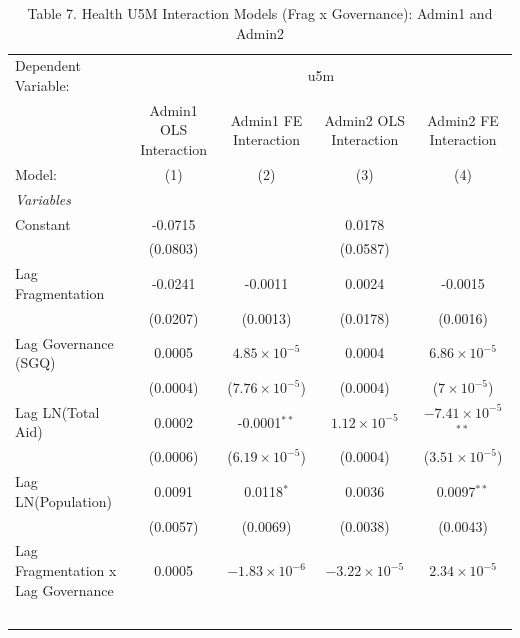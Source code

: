 \begin{table}[H]
   \caption{Table 7. Health U5M Interaction Models (Frag x Governance): Admin1 and Admin2}
   \centering
   \begin{tabular}{lcccc}
      \tabularnewline \midrule \midrule
      Dependent Variable: & \multicolumn{4}{c}{u5m}\\
                                         & Admin1 OLS Interaction & Admin1 FE Interaction   & Admin2 OLS Interaction & Admin2 FE Interaction \\   
      Model:                             & (1)                    & (2)                     & (3)                    & (4)\\  
      \midrule
      \emph{Variables}\\
      Constant                           & -0.0715                &                         & 0.0178                 &   \\   
                                         & (0.0803)               &                         & (0.0587)               &   \\   
      Lag Fragmentation                  & -0.0241                & -0.0011                 & 0.0024                 & -0.0015\\   
                                         & (0.0207)               & (0.0013)                & (0.0178)               & (0.0016)\\   
      Lag Governance (SGQ)               & 0.0005                 & $4.85\times 10^{-5}$    & 0.0004                 & $6.86\times 10^{-5}$\\    
                                         & (0.0004)               & ($7.76\times 10^{-5}$)  & (0.0004)               & ($7\times 10^{-5}$)\\    
      Lag LN(Total Aid)                  & 0.0002                 & -0.0001$^{**}$          & $1.12\times 10^{-5}$   & $-7.41\times 10^{-5}$$^{**}$\\    
                                         & (0.0006)               & ($6.19\times 10^{-5}$)  & (0.0004)               & ($3.51\times 10^{-5}$)\\    
      Lag LN(Population)                 & 0.0091                 & 0.0118$^{*}$            & 0.0036                 & 0.0097$^{**}$\\   
                                         & (0.0057)               & (0.0069)                & (0.0038)               & (0.0043)\\   
      Lag Fragmentation x Lag Governance & 0.0005                 & $-1.83\times 10^{-6}$   & $-3.22\times 10^{-5}$  & $2.34\times 10^{-5}$\\    
$$
\end{tabular}
\end{table}
